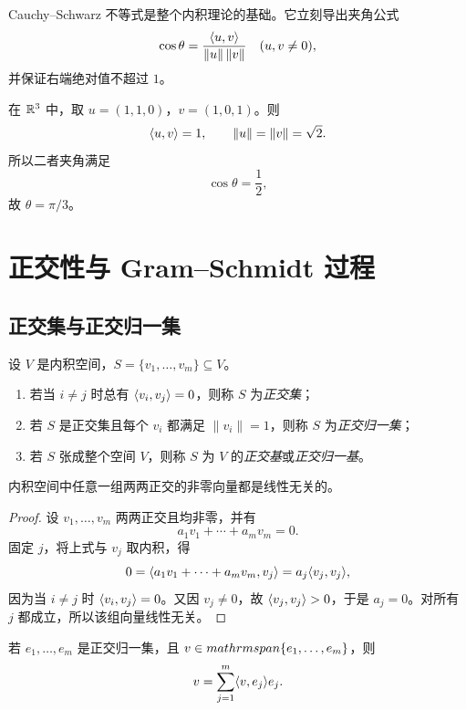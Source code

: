 \begin{remark}
Cauchy--Schwarz 不等式是整个内积理论的基础。它立刻导出夹角公式
\[
\cos\theta=\frac{\langle u, v \rangle}{\|u\|\,\|v\|}
\quad (u,v\ne 0),
\]
并保证右端绝对值不超过 $1$。
\end{remark}

\begin{example}
在 $\mathbb{R}^3$ 中，取 $u=(1,1,0)$，$v=(1,0,1)$。则
\[
\langle u, v \rangle=1,\qquad \|u\|=\|v\|=\sqrt{2}.
\]
所以二者夹角满足
\[
\cos\theta=\frac{1}{2},
\]
故 $\theta=\pi/3$。
\end{example}

\section{正交性与 Gram--Schmidt 过程}

\subsection{正交集与正交归一集}

\begin{definition}
设 $V$ 是内积空间，$S=\{v_1,\dots,v_m\}\subseteq V$。
\begin{enumerate}[label=\textnormal{(\arabic*)}]
  \item 若当 $i\ne j$ 时总有 $\langle v_i, v_j \rangle=0$，则称 $S$ 为\emph{正交集}；
  \item 若 $S$ 是正交集且每个 $v_i$ 都满足 $\|v_i\|=1$，则称 $S$ 为\emph{正交归一集}；
  \item 若 $S$ 张成整个空间 $V$，则称 $S$ 为 $V$ 的\emph{正交基}或\emph{正交归一基}。
\end{enumerate}
\end{definition}

\begin{proposition}
内积空间中任意一组两两正交的非零向量都是线性无关的。
\end{proposition}

\begin{proof}
设 $v_1,\dots,v_m$ 两两正交且均非零，并有
\[
a_1v_1+\cdots+a_mv_m=0.
\]
固定 $j$，将上式与 $v_j$ 取内积，得
\[
0=\langle a_1v_1+\cdots+a_mv_m, v_j \rangle=a_j\langle v_j, v_j \rangle,
\]
因为当 $i\ne j$ 时 $\langle v_i, v_j \rangle=0$。又因 $v_j\ne 0$，故 $\langle v_j, v_j \rangle>0$，于是 $a_j=0$。对所有 $j$ 都成立，所以该组向量线性无关。
\end{proof}

\begin{proposition}
若 $e_1,\dots,e_m$ 是正交归一集，且 $v\in \\mathrm{span}\{e_1,\dots,e_m\}$，则
\[
v=\sum_{j=1}^m \langle v, e_j \rangle e_j.
\]
\end{proposition}


